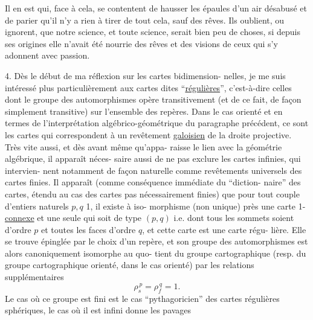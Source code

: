
Il en est qui, face à cela, se contentent de hausser les
épaules d'un air  désabusé et de parier qu'il n'y a rien à tirer
de tout cela, sauf des rêves. Ils oublient, ou ignorent, que notre
science, et toute science, serait bien peu  de choses, si depuis
ses origines elle n'avait été nourrie des rêves et des visions
de ceux qui s'y adonnent avec passion.

4.        Dès le début de ma réflexion sur les cartes bidimension-%
nelles, je me suis intéressé plus particulièrement aux cartes dites
``\uline{régulières}'', c'est-à-dire celles dont le groupe des automorphismes
opère transitivement (et de ce fait, de façon simplement transitive)
sur l'ensemble des repères. Dans le cas orienté et en termes de
l'interprétation algébrico-géométrique du paragraphe précédent,
ce sont les cartes qui correspondent à un revêtement \uline{galoisien} de
la droite projective. Très vite aussi, et dès avant même qu'appa-%
raisse le lien avec la géométrie algébrique, il apparaît néces-%
saire aussi de ne pas exclure les cartes infinies, qui intervien-%
nent notamment de façon naturelle comme revêtements universels des
cartes finies. Il apparaît (comme conséquence immédiate du ``diction-%
naire'' des cartes, étendu au cas des cartes pas nécessairement finies)
que pour tout couple d'entiers naturels  $p, q$ \hand{$\geq$} 1, il existe à iso-%
morphisme (non unique) près une carte 1-\uline{connexe} et une seule qui
soit de type  $(p,q)$  i.e. dont tous les sommets soient d'ordre  $p$
et toutes les faces d'ordre  $q$, et cette carte est une carte régu-%
lière. Elle se trouve épinglée par le choix d'un repère, et son
groupe des automorphismes est alors canoniquement isomorphe au quo-%
tient du groupe cartographique (resp. du groupe cartographique
orienté, dans le cas orienté) par les relations supplémentaires
\[ \rho_s^{\,p} = \rho_f^{\,q} = 1. \]
Le cas où ce groupe est fini est le cas ``pythagoricien'' des cartes
régulières sphériques, le cas où il est infini donne les pavages

